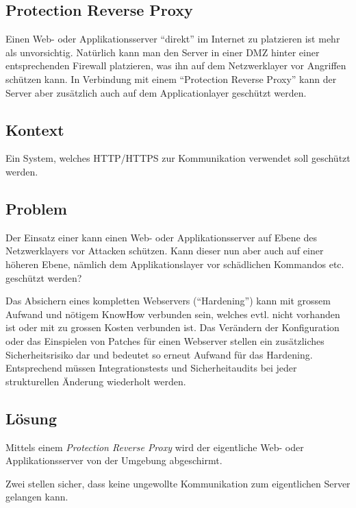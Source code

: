 \subsection{Protection Reverse Proxy}
\label{sec:proteciton-reverse-proxy}

Einen Web- oder Applikationsserver ``direkt'' im Internet zu platzieren ist mehr als unvorsichtig. Natürlich kann man den Server in einer DMZ hinter einer entsprechenden Firewall platzieren, was ihn auf dem Netzwerklayer vor Angriffen schützen kann. In Verbindung mit einem ``Protection Reverse Proxy'' kann der Server aber zusätzlich auch auf dem Applicationlayer geschützt werden.

\subsection*{Kontext}
Ein System, welches HTTP/HTTPS zur Kommunikation verwendet soll geschützt werden.

\subsection*{Problem}
Der Einsatz einer  kann einen Web- oder Applikationsserver auf Ebene des Netzwerklayers vor Attacken schützen. Kann dieser nun aber auch auf einer höheren Ebene, nämlich dem Applikationslayer vor schädlichen Kommandos etc. geschützt werden?

Das Absichern eines kompletten Webservers (``\gls{Hardening}'') kann mit grossem Aufwand und nötigem KnowHow verbunden sein, welches evtl. nicht vorhanden ist oder mit zu grossen Kosten verbunden ist.
Das Verändern der Konfiguration oder das Einspielen von Patches für einen Webserver stellen ein zusätzliches Sicherheitsrisiko dar und bedeutet so erneut Aufwand für das Hardening. Entsprechend müssen Integrationstests und Sicherheitaudits bei jeder strukturellen Änderung wiederholt werden.

\subsection*{Lösung}
Mittels einem \emph{Protection Reverse Proxy} wird der eigentliche Web- oder Applikationsserver von der Umgebung abgeschirmt.

Zwei  stellen sicher, dass keine ungewollte Kommunikation zum eigentlichen Server gelangen kann.

